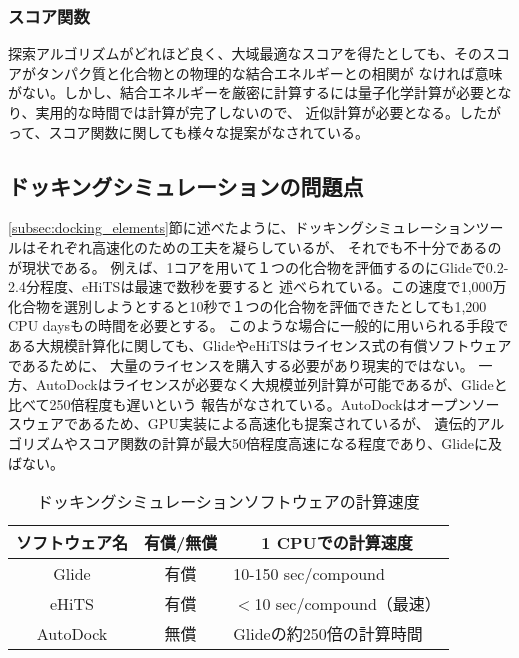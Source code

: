 \subsubsection{スコア関数}
探索アルゴリズムがどれほど良く、大域最適なスコアを得たとしても、そのスコアがタンパク質と化合物との物理的な結合エネルギーとの相関が
なければ意味がない。しかし、結合エネルギーを厳密に計算するには量子化学計算が必要となり、実用的な時間では計算が完了しないので、
近似計算が必要となる。したがって、スコア関数に関しても様々な提案がなされている。

\subsection{ドッキングシミュレーションの問題点}\label{subsec:docking_problem}
\ref{subsec:docking_elements}節に述べたように、ドッキングシミュレーションツールはそれぞれ高速化のための工夫を凝らしているが、
それでも不十分であるのが現状である。
例えば、1コアを用いて１つの化合物を評価するのにGlideで0.2-2.4分程度\cite{Friesner2004}、eHiTSは最速で数秒\cite{Zsoldos2007}を要すると
述べられている。この速度で1,000万化合物を選別しようとすると10秒で１つの化合物を評価できたとしても1,200 CPU daysもの時間を必要とする。
このような場合に一般的に用いられる手段である大規模計算化に関しても、GlideやeHiTSはライセンス式の有償ソフトウェアであるために、
大量のライセンスを購入する必要があり現実的ではない。
一方、AutoDockはライセンスが必要なく大規模並列計算が可能であるが、Glideと比べて250倍程度も遅いという
報告がなされている\cite{Tuccinardi2010}。AutoDockはオープンソースウェアであるため、GPU実装による高速化も提案されているが、
遺伝的アルゴリズムやスコア関数の計算が最大50倍程度高速になる程度であり\cite{Kannan2010}、Glideに及ばない。

\begin{table}[htb] \centering
	\caption{ドッキングシミュレーションソフトウェアの計算速度}
	\label{table:docking_tools}
	\begin{tabular}{c|cl}
	\hline
	ソフトウェア名					&有償/無償				&\multicolumn{1}{c}{1 CPUでの計算速度} 					\\ \hline
	Glide							&有償						&10-150 sec/compound\cite{Friesner2004}				\\
	eHiTS							&有償						&$<$10 sec/compound（最速）\cite{Zsoldos2007}			\\
	AutoDock					&無償						&Glideの約250倍の計算時間\cite{Tuccinardi2010}		\\ \hline
	\end{tabular}
\end{table}

